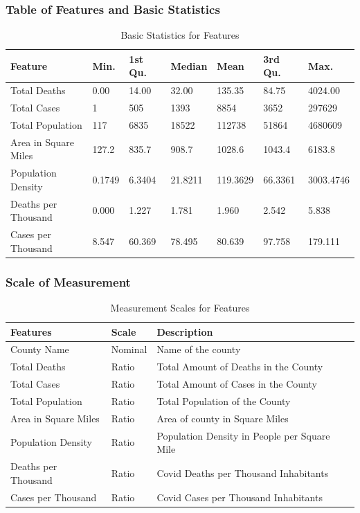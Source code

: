 \documentclass[
]{article}
\begin{document}
\subsubsection{Table of Features and Basic
Statistics}\label{table-of-features-and-basic-statistics-1}

\begingroup\fontsize{10}{12}\selectfont

\begin{longtable}[t]{lllllll}
\caption{\label{tab:unnamed-chunk-4}Basic Statistics for Features}\\
\toprule
Feature & Min. & 1st Qu. & Median & Mean & 3rd Qu. & Max.\\
\midrule
Total Deaths & 0.00 & 14.00 & 32.00 & 135.35 & 84.75 & 4024.00\\
Total Cases & 1 & 505 & 1393 & 8854 & 3652 & 297629\\
Total Population & 117 & 6835 & 18522 & 112738 & 51864 & 4680609\\
Area in Square Miles & 127.2 & 835.7 & 908.7 & 1028.6 & 1043.4 & 6183.8\\
Population Density & 0.1749 & 6.3404 & 21.8211 & 119.3629 & 66.3361 & 3003.4746\\
\addlinespace
Deaths per Thousand & 0.000 & 1.227 & 1.781 & 1.960 & 2.542 & 5.838\\
Cases per Thousand & 8.547 & 60.369 & 78.495 & 80.639 & 97.758 & 179.111\\
\bottomrule
\end{longtable}
\endgroup{}

\subsubsection{Scale of Measurement}\label{scale-of-measurement-1}

\begingroup\fontsize{10}{12}\selectfont

\begin{longtable}[t]{lll}
\caption{\label{tab:unnamed-chunk-5}Measurement Scales for Features}\\
\toprule
Features & Scale & Description\\
\midrule
County Name & Nominal & Name of the county\\
Total Deaths & Ratio & Total Amount of Deaths in the County\\
Total Cases & Ratio & Total Amount of Cases in the County\\
Total Population & Ratio & Total Population of the County\\
Area in Square Miles & Ratio & Area of county in Square Miles\\
\addlinespace
Population Density & Ratio & Population Density in People per Square Mile\\
Deaths per Thousand & Ratio & Covid Deaths per Thousand Inhabitants\\
Cases per Thousand & Ratio & Covid Cases per Thousand Inhabitants\\
\bottomrule
\end{longtable}
\endgroup{}
\end{document}
